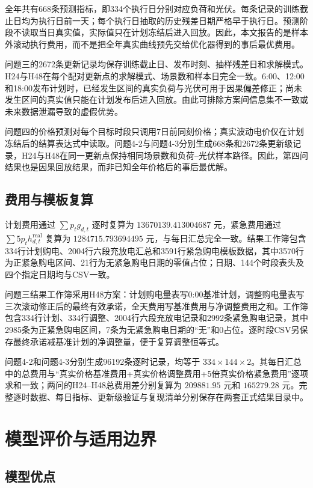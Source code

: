 \documentclass[UTF8,12pt,a4paper]{ctexart}
\begin{document}
全年共有668条预测指标，即334个执行日分别对应负荷和光伏。每条记录的训练截止日均为执行日前一天；每个执行日抽取的历史残差日期严格早于执行日。预测阶段不读取当日真实值，实际值只在计划冻结后进入回放。因此，本文报告的是样本外滚动执行费用，而不是把全年真实曲线预先交给优化器得到的事后最优费用。

问题三的2672条更新记录均保存训练截止日、发布时刻、抽样残差日和求解模式。H24与H48在每个配对更新点的求解模式、场景数和样本日完全一致。6:00、12:00和18:00发布计划时，已经发生区间的真实负荷与光伏可用于因果偏差修正；尚未发生区间的真实值只能在计划发布后进入回放。由此可排除方案间信息集不一致或未来数据泄漏导致的虚假优势。

问题四的价格预测对每个目标时段只调用7日前同刻价格；真实波动电价仅在计划冻结后的结算表达式中读取。问题4-2与问题4-3分别生成668条和2672条更新级记录，H24与H48在同一更新点保持相同场景数和负荷--光伏样本路径。因此，第四问结果也是因果回放结果，而非已知全年价格后的事后最优解。

\subsection{费用与模板复算}

计划费用通过 $\sum p_tg_{d,t}$ 逐时复算为 $13670139.413004687$ 元，紧急费用通过 $\sum5p_th_{d,t}^{\mathrm{real}}$ 复算为 $1284715.793694495$ 元，与每日汇总完全一致。结果工作簿包含334行计划购电、2004行六段充放电汇总和3591行紧急购电模板数据，其中3570行为正紧急购电区间、21行为无紧急购电日期的零值占位；日期、144个时段表头及四个指定日期均与CSV一致。

问题三结果工作簿采用H48方案：计划购电量表写0:00基准计划，调整购电量表写三次滚动修正后的最终有效承诺，全天费用写基准费用与净调整费用之和。工作簿包含334行计划、334行调整、2004行六段充放电记录和2992条紧急购电记录，其中2985条为正紧急购电区间，7条为无紧急购电日期的“无”和0占位。逐时段CSV另保存最终承诺减基准计划的净调整量，便于复算调整恒等式。

问题4-2和问题4-3分别生成96192条逐时记录，均等于 $334\times144\times2$。其每日汇总中的总费用与“真实价格基准费用+真实价格调整费用+5倍真实价格紧急费用”逐项求和一致；两问的H24--H48总费用差分别复算为 $209881.95$ 元和 $165279.28$ 元。完整逐时数据、每日指标、更新级验证与复现清单分别保存在两套正式结果目录中。

\section{模型评价与适用边界}

\subsection{模型优点}
\end{document}
